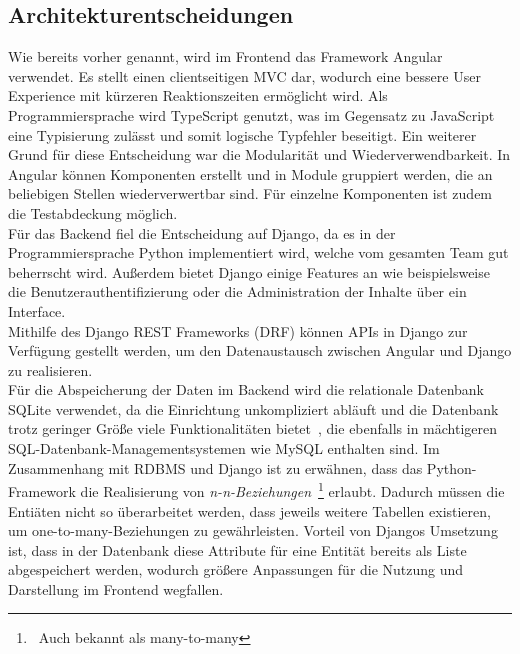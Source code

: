 \documentclass[conference]{IEEEtran}
\begin{document}
\subsection{Architekturentscheidungen}\label{arch-choices}
Wie bereits vorher genannt, wird im Frontend das Framework Angular verwendet. Es stellt einen clientseitigen MVC dar, wodurch eine bessere User Experience mit kürzeren Reaktionszeiten ermöglicht wird. Als Programmiersprache wird TypeScript genutzt, was im Gegensatz zu JavaScript eine Typisierung zulässt und somit logische Typfehler beseitigt. Ein weiterer Grund für diese Entscheidung war die Modularität und Wiederverwendbarkeit. In Angular können Komponenten erstellt und in Module gruppiert werden, die an beliebigen Stellen wiederverwertbar sind. Für einzelne Komponenten ist zudem die Testabdeckung möglich.\\
Für das Backend fiel die Entscheidung auf Django, da es in der Programmiersprache Python implementiert wird, welche vom gesamten Team gut beherrscht wird. Außerdem bietet Django einige Features an wie beispielsweise die Benutzerauthentifizierung oder die Administration der Inhalte über ein Interface.\\
Mithilfe des Django REST Frameworks (DRF) können APIs in Django zur Verfügung gestellt werden, um den Datenaustausch zwischen Angular und Django zu realisieren.\\
Für die Abspeicherung der Daten im Backend wird die relationale Datenbank SQLite verwendet, da die Einrichtung unkompliziert abläuft und die Datenbank trotz geringer Größe viele Funktionalitäten bietet~\cite{sqlite}, die ebenfalls in mächtigeren SQL-Datenbank-Managementsystemen wie MySQL enthalten sind. Im Zusammenhang mit RDBMS und Django ist zu erwähnen, dass das Python-Framework die Realisierung von \textit{n-n-Beziehungen}~\footnote{~Auch bekannt als many-to-many} erlaubt. Dadurch müssen die Entiäten nicht so überarbeitet werden, dass jeweils weitere Tabellen existieren, um one-to-many-Beziehungen zu gewährleisten. Vorteil von Djangos Umsetzung ist, dass in der Datenbank diese Attribute für eine Entität bereits als Liste abgespeichert werden, wodurch größere Anpassungen für die Nutzung und Darstellung im Frontend wegfallen.
\end{document}
